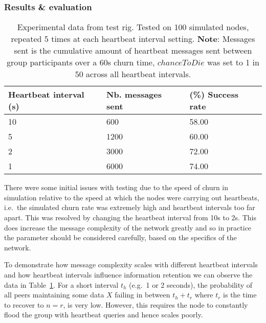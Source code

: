 \subsubsection{Results \& evaluation}

\begin{table}[ht]
    \centering
    \begin{tabular}{|l|l|l|}
        \hline
        Heartbeat interval (s) & Nb. messages sent & (\%) Success rate \\
        \hline
        10                     & 600               & 58.00             \\
        5                      & 1200              & 60.00             \\
        2                      & 3000              & 72.00             \\
        1                      & 6000              & 74.00             \\
        \hline
    \end{tabular}
    \caption{Experimental data from test rig. Tested on 100 simulated nodes, repeated 5 times at each heartbeat interval setting. \textbf{Note}: Messages sent is the cumulative amount of heartbeat messages sent between group participants over a 60s churn time, $chanceToDie$ was set to 1 in 50 across all heartbeat intervals.}
    \label{tab:heartbeatSuccess}
\end{table}

There were some initial issues with testing due to the speed of churn in simulation relative to the speed at which the nodes were carrying out heartbeats, i.e.\ the simulated churn rate was extremely high and heartbeat intervals too far apart. This was resolved by changing the heartbeat interval from 10s to 2s. This does increase the message complexity of the network greatly and so in practice the parameter should be considered carefully, based on the specifics of the network.

To demonstrate how message complexity scales with different heartbeat intervals and how heartbeat intervals influence information retention we can observe the data in Table~\ref{tab:heartbeatSuccess}. For a short interval $t_h$ (e.g.\ 1 or 2 seconds), the probability of all peers maintaining some data $X$ failing in between $t_h+t_r$ where $t_r$ is the time to recover to $n=r$, is very low. However, this requires the node to constantly flood the group with heartbeat queries and hence scales poorly.


